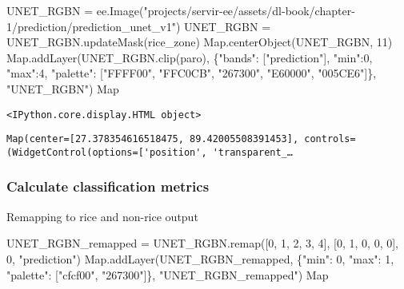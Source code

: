 \documentclass[
  letterpaper,
  DIV=11,
  numbers=noendperiod]{scrreprt}
\newenvironment{Shaded}{\begin{snugshade}}{\end{snugshade}}
\newcommand{\DecValTok}[1]{\textcolor[rgb]{0.68,0.00,0.00}{#1}}
\newcommand{\NormalTok}[1]{\textcolor[rgb]{0.00,0.23,0.31}{#1}}
\newcommand{\OperatorTok}[1]{\textcolor[rgb]{0.37,0.37,0.37}{#1}}
\newcommand{\StringTok}[1]{\textcolor[rgb]{0.13,0.47,0.30}{#1}}
\begin{document}
\begin{Shaded}
\begin{Highlighting}[]
\NormalTok{UNET\_RGBN }\OperatorTok{=}\NormalTok{ ee.Image(}\StringTok{"projects/servir{-}ee/assets/dl{-}book/chapter{-}1/prediction/prediction\_unet\_v1"}\NormalTok{)}
\NormalTok{UNET\_RGBN }\OperatorTok{=}\NormalTok{ UNET\_RGBN.updateMask(rice\_zone)}
\NormalTok{Map.centerObject(UNET\_RGBN, }\DecValTok{11}\NormalTok{)}
\NormalTok{Map.addLayer(UNET\_RGBN.clip(paro), \{}\StringTok{"bands"}\NormalTok{: [}\StringTok{"prediction"}\NormalTok{], }\StringTok{"min"}\NormalTok{:}\DecValTok{0}\NormalTok{, }\StringTok{"max"}\NormalTok{:}\DecValTok{4}\NormalTok{, }\StringTok{"palette"}\NormalTok{: [}\StringTok{"FFFF00"}\NormalTok{, }\StringTok{"FFC0CB"}\NormalTok{, }\StringTok{"267300"}\NormalTok{, }\StringTok{"E60000"}\NormalTok{, }\StringTok{"005CE6"}\NormalTok{]\}, }\StringTok{"UNET\_RGBN"}\NormalTok{)}
\NormalTok{Map}
\end{Highlighting}
\end{Shaded}

\begin{verbatim}
<IPython.core.display.HTML object>
\end{verbatim}

\begin{verbatim}
Map(center=[27.378354616518475, 89.42005508391453], controls=(WidgetControl(options=['position', 'transparent_…
\end{verbatim}

\subsubsection{Calculate classification
metrics}\label{calculate-classification-metrics}

Remapping to rice and non-rice output

\begin{Shaded}
\begin{Highlighting}[]
\NormalTok{UNET\_RGBN\_remapped }\OperatorTok{=}\NormalTok{ UNET\_RGBN.remap([}\DecValTok{0}\NormalTok{, }\DecValTok{1}\NormalTok{, }\DecValTok{2}\NormalTok{, }\DecValTok{3}\NormalTok{, }\DecValTok{4}\NormalTok{], [}\DecValTok{0}\NormalTok{, }\DecValTok{1}\NormalTok{, }\DecValTok{0}\NormalTok{, }\DecValTok{0}\NormalTok{, }\DecValTok{0}\NormalTok{], }\DecValTok{0}\NormalTok{, }\StringTok{"prediction"}\NormalTok{)}
\NormalTok{Map.addLayer(UNET\_RGBN\_remapped, \{}\StringTok{"min"}\NormalTok{: }\DecValTok{0}\NormalTok{, }\StringTok{"max"}\NormalTok{: }\DecValTok{1}\NormalTok{, }\StringTok{"palette"}\NormalTok{: [}\StringTok{"cfcf00"}\NormalTok{, }\StringTok{"267300"}\NormalTok{]\}, }\StringTok{"UNET\_RGBN\_remapped"}\NormalTok{)}
\NormalTok{Map}
\end{Highlighting}
\end{Shaded}
\end{document}
